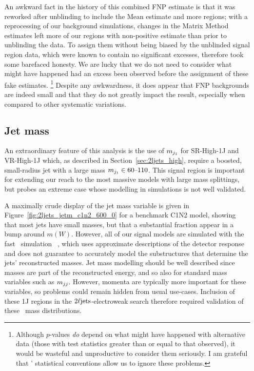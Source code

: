 An awkward fact in the history of this combined FNP estimate is that it
was reworked after unblinding to include the Mean estimate and more regions;
with a reprocessing of our background simulations, changes in the Matrix Method
estimates left more of our regions with non-positive estimate than prior to
unblinding the data.
To assign them without being biased by the unblinded signal region data,
which were known to contain no significant excesses, therefore took some
barefaced honesty.
We are lucky that we do not need to consider what might have happened had an
excess been observed before the assignment of these fake estimates.%
\footnote{%
Although $p$-values \emph{do} depend on what might have happened with
alternative data
(those with test statistics greater than or equal to that observed),
it would be wasteful and unproductive to consider them seriously.
I am grateful that \atlas' statistical conventions allow us to ignore these
problems.
}
Despite any awkwardness, it does appear that FNP backgrounds are indeed
small and that they do not greatly impact the result, especially when compared
to other systematic variations.


\subsection{Jet mass}
\label{sec:2ljets_jet_mass}
An extraordinary feature of this analysis is the use of $m_{j_1}$ for
SR-High-1J and VR-High-1J which, as described in Section~\ref{sec:2ljets_high},
require a boosted, small-radius jet with a large mass
$m_{j_1} \in 60\textrm{--}110$.
This signal region is important for extending our reach to the most massive
models with large mass splittings, but probes an extreme case whose modelling
in simulations is not well validated.

A maximally crude display of the jet mass variable is given in
Figure~\ref{fig:2ljets_jetm_c1n2_600_0} for a benchmark C1N2 model, showing
that most  jets have small masses, but that a substantial fraction appear in a
bump around $m(W)$.
However, all of our signal models are simulated with the fast \atlas\ simulation
\afii\ \cite{SOFT-2010-01}, which uses approximate descriptions of the
detector response and does not guarantee to accurately model the substructures
that determine the jets' reconstructed masses.
Jet mass modelling should be well described since masses are part of the
reconstructed energy, and so also for standard mass variables such as $m_{jj}$.
However, momenta are typically more important for these variables, so
problems could remain hidden from usual use-cases.
Inclusion of these 1J regions in the $2\ell\mathrm{jets}$-electroweak search therefore
required validation of these \afii\ mass distributions.

